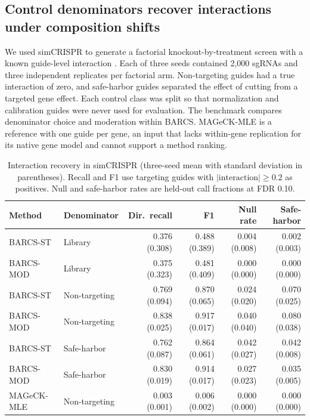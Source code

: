 \subsection{Control denominators recover interactions under composition shifts}
\label{sec:simcrispr}

We used simCRISPR to generate a factorial knockout-by-treatment screen with a
known guide-level interaction \citep{zhu2026simcrispr}.  Each of three seeds
contained 2,000 sgRNAs and three independent replicates per factorial arm.
Non-targeting guides had a true interaction of zero, and safe-harbor guides
separated the effect of cutting from a targeted gene effect.  Each control
class was split so that normalization and calibration guides were never used
for evaluation.  The benchmark compares denominator choice and moderation
within BARCS. MAGeCK-MLE is a reference with one guide per gene, an input that
lacks within-gene replication for its native gene model and cannot support a
method ranking.

\begin{table}[ht]
\centering
\caption{Interaction recovery in simCRISPR (three-seed mean with standard
deviation in parentheses).  Recall and F1
use targeting guides with $|\mathrm{interaction}|\geq0.2$ as positives.  Null
and safe-harbor rates are held-out call fractions at FDR 0.10.}
\label{tab:simcrispr}
\scriptsize
\setlength{\tabcolsep}{2.5pt}
\begin{tabular}{llrrrr}
\toprule
Method & Denominator & Dir.\ recall & F1 & Null rate & Safe-harbor\\
\midrule
BARCS-ST & Library &
0.376 (0.308) & 0.488 (0.389) & 0.004 (0.008) & 0.002 (0.003)\\
BARCS-MOD & Library &
0.375 (0.323) & 0.481 (0.409) & 0.000 (0.000) & 0.000 (0.000)\\
\midrule
BARCS-ST & Non-targeting &
0.769 (0.094) & 0.870 (0.065) & 0.024 (0.020) & 0.070 (0.025)\\
BARCS-MOD & Non-targeting &
0.838 (0.025) & 0.917 (0.017) & 0.040 (0.040) & 0.080 (0.038)\\
\midrule
BARCS-ST & Safe-harbor &
0.762 (0.087) & 0.864 (0.061) & 0.042 (0.027) & 0.042 (0.008)\\
BARCS-MOD & Safe-harbor &
0.830 (0.019) & 0.914 (0.017) & 0.027 (0.023) &
0.035 (0.005)\\
\midrule
MAGeCK-MLE & Non-targeting &
0.003 (0.001) & 0.006 (0.002) & 0.000 (0.000) & 0.000 (0.000)\\
\bottomrule
\end{tabular}
\end{table}

